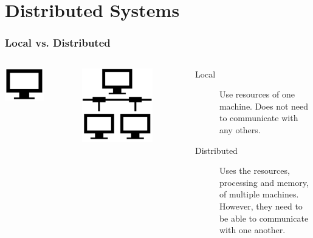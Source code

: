 \documentclass{beamer}
\begin{document}
\section{Distributed Systems}
\begin{frame}
  \frametitle{Local vs. Distributed}
  \begin{columns}
      \centering
      \includegraphics[width=0.6\textwidth]{../images/single_machine.png} \vspace{5mm}

      \includegraphics[width=0.7\textwidth]{../images/distributed.png}
    \begin{description}
      \item[Local] Use resources of one machine. Does not need to communicate with any others.
      \item[Distributed] Uses the resources, processing and memory, of multiple machines. However, they need to be able to communicate with one another.
    \end{description}
  \end{columns}
\end{frame}
\end{document}
